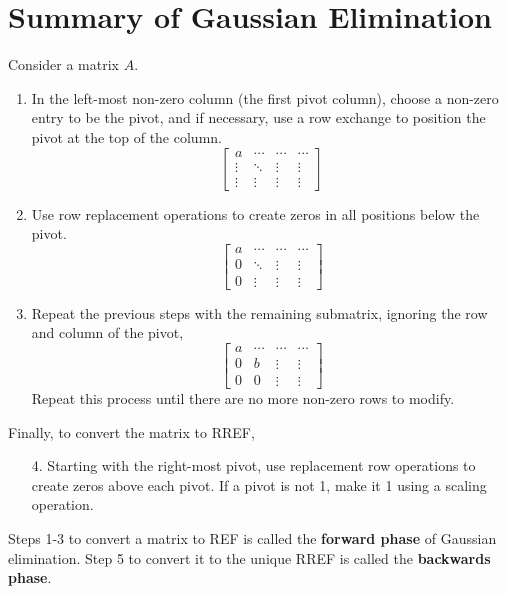 \documentclass[letterpaper,12pt]{article}
\begin{document}
\section*{Summary of Gaussian Elimination}
Consider a matrix $A$.
\begin{enumerate}
    \item In the left-most non-zero column (the first pivot column), choose a non-zero entry to be the pivot, and if necessary, use a row exchange to position the pivot at the top of the column.
    \begin{equation*}
        \begin{bmatrix} a & \cdots & \cdots & \cdots \\
        \vdots & \ddots & \vdots & \vdots \\
        \vdots & \vdots & \vdots & \vdots \end{bmatrix}
    \end{equation*}
    \item Use row replacement operations to create zeros in all positions below the pivot.
    \begin{equation*}
        \begin{bmatrix} a & \cdots & \cdots & \cdots \\
        0 & \ddots & \vdots & \vdots \\
        0 & \vdots & \vdots & \vdots \end{bmatrix}
    \end{equation*}
    \item Repeat the previous steps with the remaining submatrix, ignoring the row and column of the pivot,
    \begin{equation*}
        \begin{bmatrix}
        a & \cdots & \cdots & \cdots \\
        0 & b & \vdots & \vdots \\
        0 & 0 & \vdots & \vdots
        \end{bmatrix}    
    \end{equation*}
    Repeat this process until there are no more non-zero rows to modify.
\end{enumerate}
Finally, to convert the matrix to RREF,
\begin{enumerate}
    \item[4.] Starting with the right-most pivot, use replacement row operations to create zeros above each pivot. If a pivot is not 1, make it 1 using a scaling operation. 
\end{enumerate}
Steps 1-3 to convert a matrix to REF is called the \textbf{forward phase} of Gaussian elimination. Step 5 to convert it to the unique RREF is called the \textbf{backwards phase}.
\end{document}
